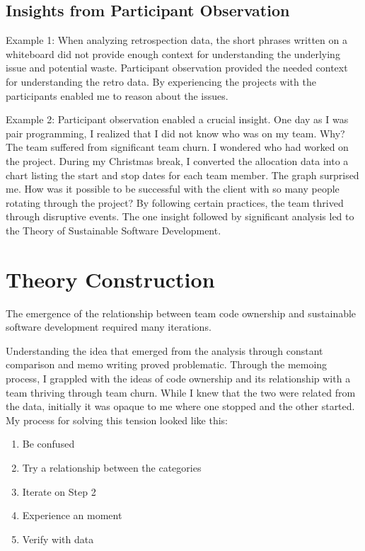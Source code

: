 \subsection{Insights from Participant Observation}
Example 1: When analyzing retrospection data, the short phrases written on a whiteboard did not provide enough context for understanding the underlying issue and potential waste. Participant observation provided the needed context for understanding the retro data. By experiencing the projects with the participants enabled me to reason about the issues. 

Example 2: Participant observation enabled a crucial insight. One day as I was pair programming, I realized that I did not know who was on my team. Why? The team suffered from significant team churn. I wondered who had worked on the project. During my Christmas break, I converted the allocation data into a chart listing the start and stop dates for each team member. The graph surprised me. How was it possible to be successful \cite{RalphDimensionsOfSuccess} with the client with so many people rotating through the project? By following certain practices, the team thrived through disruptive events. The one insight followed by significant analysis led to the Theory of Sustainable Software Development. 


\section{Theory Construction}
\label{TheoryConstruction}
The emergence of the relationship between team code ownership and sustainable software development required many iterations. 

Understanding the idea that emerged from the analysis through constant comparison and memo writing proved problematic. Through the memoing process, I grappled with the ideas of code ownership and its relationship with a team thriving through team churn. While I knew that the two were related from the data, initially it was opaque to me where one stopped and the other started.  My process for solving this tension looked like this:

\begin{enumerate}
  \item Be confused
  \item Try a relationship between the categories
  \item Iterate on Step 2
  \item Experience an  moment
  \item Verify with data
\end{enumerate}

